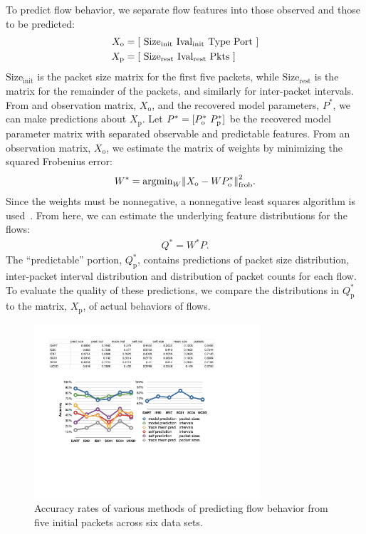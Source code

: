 \documentclass{acm_proc_article-sp}
\begin{document}
To predict flow behavior, we separate flow features into those observed and those to be predicted:
\begin{align}
  X_\text{o} &= {\left[ ~
    \text{Size}_\text{init} ~
    \text{Ival}_\text{init} ~
    \text{Type} ~
    \text{Port} ~
  \right]} \\
  X_\text{p} &= {\left[ ~
    \text{Size}_\text{rest} ~
    \text{Ival}_\text{rest} ~
    \text{Pkts} ~
  \right]}
\end{align}
$\text{Size}_\text{init}$ is the packet size matrix for the first five packets, while $\text{Size}_\text{rest}$ is the matrix for the remainder of the packets, and similarly for inter-packet intervals.
From and observation matrix, $X_\text{o}$, and the recovered model parameters, $P^*$, we can make predictions about $X_\text{p}$.
Let $P^* = {[P^*_\text{o}~P^*_\text{p}]}$ be the recovered model parameter matrix  with separated observable and predictable features.
From an observation matrix, $X_\text{o}$, we estimate the matrix of weights by minimizing the squared Frobenius error:
\begin{align}
  W^* = \text{argmin}_W {{\left\lVert X_\text{o} - W P^*_\text{o}\right\rVert}^2_\text{frob}}.
\end{align}
Since the weights must be nonnegative, a nonnegative least squares algorithm is used~\cite{Benthem04}.
From here, we can estimate the underlying feature distributions for the flows:
\begin{align}
  Q^* = W^*P.
\end{align}
The ``predictable'' portion, $Q^*_\text{p}$, contains predictions of packet size distribution, inter-packet interval distribution and distribution of packet counts for each flow.
To evaluate the quality of these predictions, we compare the distributions in $Q^*_\text{p}$ to the matrix, $X_\text{p}$, of actual behaviors of flows.

\begin{figure}[t]
\begin{center}
\includegraphics[width=3.3in]{pred_stats}
\caption{Accuracy rates of various methods of predicting flow behavior from five initial packets across six data sets.}
\end{center}
\vspace{-1em}
\end{figure}
\end{document}
